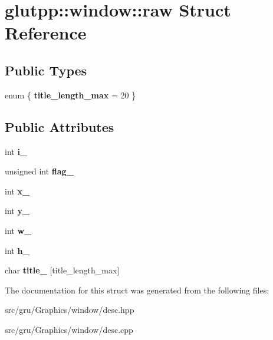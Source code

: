 \hypertarget{structglutpp_1_1window_1_1raw}{\section{glutpp\-:\-:window\-:\-:raw \-Struct \-Reference}
\label{structglutpp_1_1window_1_1raw}
}
\subsection*{\-Public \-Types}
\begin{DoxyCompactItemize}
\item 
enum \{ {\bfseries title\-\_\-length\-\_\-max} =  20
 \}
\end{DoxyCompactItemize}
\subsection*{\-Public \-Attributes}
\begin{DoxyCompactItemize}
\item 
\hypertarget{structglutpp_1_1window_1_1raw_a4eeade94ec87dac019770270b37e09cd}{int {\bfseries i\-\_\-}}\label{structglutpp_1_1window_1_1raw_a4eeade94ec87dac019770270b37e09cd}

\item 
\hypertarget{structglutpp_1_1window_1_1raw_a08dced0e44c01ffc43985a36d66ac443}{unsigned int {\bfseries flag\-\_\-}}\label{structglutpp_1_1window_1_1raw_a08dced0e44c01ffc43985a36d66ac443}

\item 
\hypertarget{structglutpp_1_1window_1_1raw_a5ff2d0bdc904fb0a8a93ce6d616a02a6}{int {\bfseries x\-\_\-}}\label{structglutpp_1_1window_1_1raw_a5ff2d0bdc904fb0a8a93ce6d616a02a6}

\item 
\hypertarget{structglutpp_1_1window_1_1raw_a0298cead68c6d669c952e0d5bce4b84c}{int {\bfseries y\-\_\-}}\label{structglutpp_1_1window_1_1raw_a0298cead68c6d669c952e0d5bce4b84c}

\item 
\hypertarget{structglutpp_1_1window_1_1raw_a428737c50c97c5049c1d1ac462d9a69c}{int {\bfseries w\-\_\-}}\label{structglutpp_1_1window_1_1raw_a428737c50c97c5049c1d1ac462d9a69c}

\item 
\hypertarget{structglutpp_1_1window_1_1raw_ac11000f6c34cd873e31cd3a8156b4605}{int {\bfseries h\-\_\-}}\label{structglutpp_1_1window_1_1raw_ac11000f6c34cd873e31cd3a8156b4605}

\item 
\hypertarget{structglutpp_1_1window_1_1raw_a690b3838d8d79cda813abd808fab53a3}{char {\bfseries title\-\_\-} \mbox{[}title\-\_\-length\-\_\-max\mbox{]}}\label{structglutpp_1_1window_1_1raw_a690b3838d8d79cda813abd808fab53a3}

\end{DoxyCompactItemize}


\-The documentation for this struct was generated from the following files\-:\begin{DoxyCompactItemize}
\item 
src/gru/\-Graphics/window/desc.\-hpp\item 
src/gru/\-Graphics/window/desc.\-cpp\end{DoxyCompactItemize}
